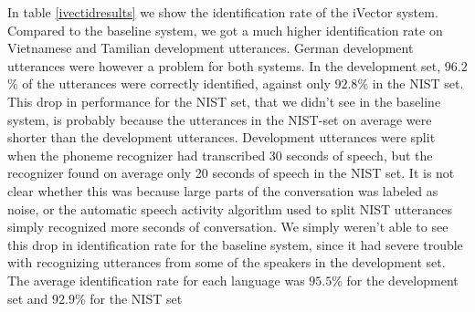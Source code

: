 In table \ref{ivectidresults} we show the identification rate of the iVector system. Compared to the baseline system, we got a much higher identification rate on Vietnamese and Tamilian development utterances. German development utterances were however a problem for both systems. In the development set, $96.2$\% of the utterances were correctly identified, against only $92.8$\% in the NIST set. This drop in performance for the NIST set, that we didn't see in the baseline system, is probably because the utterances in the NIST-set on average were shorter than the development utterances. Development utterances were split when the phoneme recognizer had transcribed 30 seconds of speech, but the recognizer found on average only 20 seconds of speech in the NIST set. It is not clear whether this was because large parts of the conversation was labeled as noise, or the automatic speech activity algorithm used to split NIST utterances simply recognized more seconds of conversation. We simply weren't able to see this drop in identification rate for the baseline system, since it had severe trouble with recognizing utterances from some of the speakers in the development set. The average identification rate for each language was $95.5$\% for the development set and $92.9$\% for the NIST set
